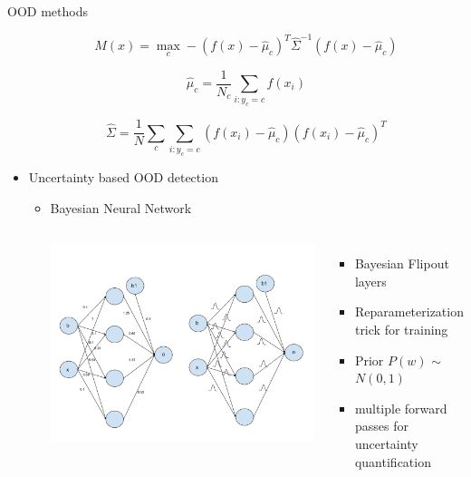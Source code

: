 \documentclass[10pt, aspectratio=169]{beamer}
\begin{document}
\begin{frame}[allowframebreaks]{OOD methods}
\begin{itemize}
        \begin{equation}
            M(x)=\max _{c}-\left(f(x)-\hat{\mu}_{c}\right)^{T} \hat{\Sigma}^{-1}\left(f(x)-\hat{\mu}_{c}\right)
        \end{equation}

        $$\hat{\mu}_{c}=\frac{1}{N_{c}} \sum_{i: y_{c}=c} f\left(x_{i}\right)$$
            
        $$\hat{\Sigma}=\frac{1}{N} \sum_{c} \sum_{i: y_{c}=c}\left(f\left(x_{i}\right)-\hat{\mu}_{c}\right)\left(f\left(x_{i}\right)-\hat{\mu}_{c}\right)^{T} $$ \newline \newline \newline
        
        \item Uncertainty based OOD detection
        \begin{itemize}
            \item Bayesian Neural Network
            \begin{columns}
                   \centering
                   \includegraphics[scale=0.275]{images/BNN.pdf}
                    \begin{itemize}
                        \item Bayesian Flipout layers \citep{Wen2018}
                        \item Reparameterization trick for training \citep{Kingma2015}
                        \item Prior $P(w)$ $\sim$ $N(0, 1)$
                        \item multiple forward passes for uncertainty quantification
                    \end{itemize}
            \end{columns} \newpage
        

\end{itemize}
\end{itemize}
\end{frame}
\end{document}

